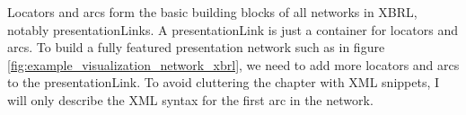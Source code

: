 Locators and arcs form the basic building blocks of all networks in XBRL, notably presentationLinks.
A presentationLink is just a container for locators and arcs.
To build a fully featured presentation network such as in figure \ref{fig:example_visualization_network_xbrl},
we need to add more locators and arcs to the presentationLink.
To avoid cluttering the chapter with XML snippets, I will only describe the XML syntax for the first arc in the network.








